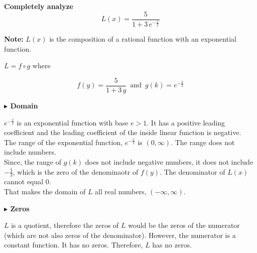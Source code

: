 \documentclass{ximera}
\begin{document}
\begin{example}

\textbf{\textcolor{purple!85!blue}{Completely analyze}} \\


\[   L(x) = \frac{5}{1 + 3 \, e^{-\tfrac{x}{2}}} \]




\textbf{Note:} $L(x)$ is the composition of a rational function with an exponential function.

$L = f \circ g$ where

\[  f(y) =  \frac{5}{1 + 3 \, y}  \, \text{ and } \, g(k) = e^{-\tfrac{k}{2}}    \]




\textbf{\textcolor{blue!55!black}{$\blacktriangleright$ Domain}} 

$e^{-\tfrac{x}{2}}$ is an exponential function with base $e > 1$.  It has a positive leading coefficient and the leading coefficient of the inside linear function is negative. \\



The range of the exponential function, $e^{-\tfrac{x}{2}}$ is $(0, \infty)$. The range does not include   numbers. \\



Since, the range of $g(k)$ does not include negative numbers, it does not include $-\frac{1}{3}$, which is the zero of the denominaotr of $f(y)$.  The denominator of $L(x)$ cannot equal $0$.  \\


 That makes the domain of $L$ all real numbers, $(-\infty, \infty)$.














\textbf{\textcolor{blue!55!black}{$\blacktriangleright$ Zeros}} 



$L$ is a quotient, therefore the zeros of $L$ would be the zeros of the numerator (which are not also zeros of the denominator).  However, the numerator is a constant function.  It has no zeros. Therefore, $L$ has no zeros.











\end{example}
\end{document}
